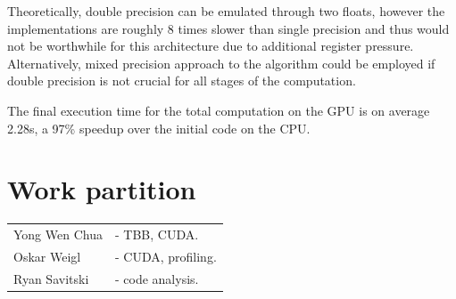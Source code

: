 \documentclass[11pt, oneside, a4paper]{article}
\begin{document}
Theoretically, double precision can be emulated through two floats, however the implementations are roughly 8 times slower than single precision and thus would not be worthwhile for this architecture due to additional register pressure. Alternatively, mixed precision approach to the algorithm could be employed if double precision is not crucial for all stages of the computation.

The final execution time for the total computation on the GPU is on average 2.28s, a 97\% speedup over the initial code on the CPU.




\section{Work partition} %
\label{sec:work_partition}
\begin{tabular}{ l l  }
Yong Wen Chua & - TBB, CUDA. \\
Oskar Weigl & - CUDA, profiling. \\
Ryan Savitski & - code analysis. \\
\end{tabular}
\end{document}
